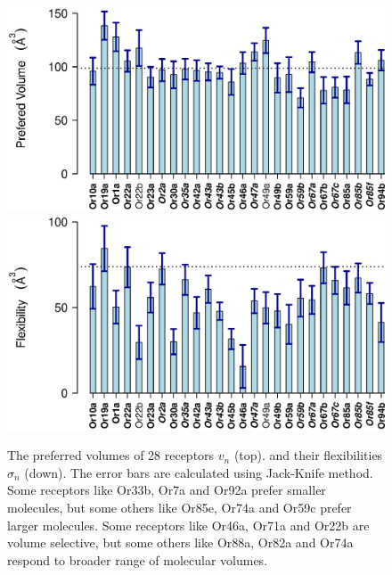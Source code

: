 \documentclass[11pt]{article} %
\newcommand{\numberofreceptors}{ 28 }
\begin{document}
\begin{figure}
		\centering
		\includegraphics[width=  0.85 \textwidth]{fig/mean-vol}
		\includegraphics[width=  0.85 \textwidth]{fig/std-vol}
	\caption{The preferred volumes of \numberofreceptors receptors $v_n$ (top). 
		and their flexibilities $\sigma_n$ (down). 
		The error bars are calculated using Jack-Knife method. 
		Some receptors like Or33b, Or7a and  Or92a prefer smaller molecules, 
		but some others like Or85e,  Or74a and  Or59c prefer larger molecules.
		Some receptors like Or46a,  Or71a and Or22b are volume  selective, 
		but some others like Or88a,  Or82a and  Or74a respond to broader range of molecular volumes.
		}
		\label{fig:preferred_volume}
		\label{fig:volume_flexibility}
\end{figure}
\end{document}
